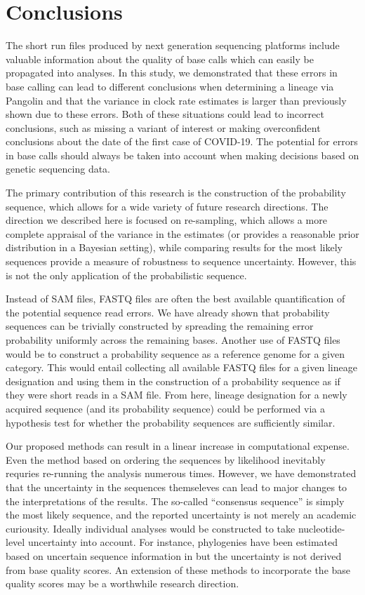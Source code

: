 \documentclass[10pt]{article}
\begin{document}
\section{Conclusions}

The short run files produced by next generation sequencing platforms include valuable information about the quality of base calls which can easily be propagated into analyses.
In this study, we demonstrated that these errors in base calling can lead to different conclusions when determining a lineage via Pangolin and that the variance in clock rate estimates is larger than previously shown due to these errors.
Both of these situations could lead to incorrect conclusions, such as missing a variant of interest or making overconfident conclusions about the date of the first case of COVID-19.
The potential for errors in base calls should always be taken into account when making decisions based on genetic sequencing data.

The primary contribution of this research is the construction of the probability sequence, which allows for a wide variety of future research directions.
The direction we described here is focused on re-sampling, which allows a more complete appraisal of the variance in the estimates (or provides a reasonable prior distribution in a Bayesian setting), while comparing results for the most likely sequences provide a measure of robustness to sequence uncertainty.
However, this is not the only application of the probabilistic sequence.

Instead of SAM files, FASTQ files are often the best available quantification of the potential sequence read errors. 
We have already shown that probability sequences can be trivially constructed by spreading the remaining error probability uniformly across the remaining bases.
Another use of FASTQ files would be to construct a probability sequence as a reference genome for a given category.
This would entail collecting all available FASTQ files for a given lineage designation and using them in the construction of a probability sequence as if they were short reads in a SAM file.
From here, lineage designation for a newly acquired sequence (and its probability sequence) could be performed via a hypothesis test for whether the probability sequences are sufficiently similar. 

Our proposed methods can result in a linear increase in computational expense.
Even the method based on ordering the sequences by likelihood inevitably requries re-running the analysis numerous times. 
However, we have demonstrated that the uncertainty in the sequences themseleves can lead to major changes to the interpretations of the results.
The so-called ``consensus sequence'' is simply the most likely sequence, and the reported uncertainty is not merely an academic curiousity.
Ideally individual analyses would be constructed to take nucleotide-level uncertainty into account.
For instance, phylogenies have been estimated based on uncertain sequence information in \citet{rossOncoNEMInferringTumor2016, jahnTreeInferenceSinglecell2016, zafarSiFitInferringTumor2017} but the uncertainty is not derived from base quality scores.
An extension of these methods to incorporate the base quality scores may be a worthwhile research direction.
\end{document}
